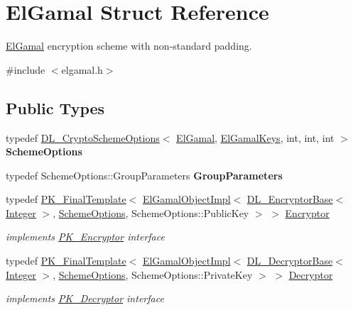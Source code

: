 \hypertarget{struct_el_gamal}{
\section{ElGamal Struct Reference}
\label{struct_el_gamal}
}


\hyperlink{struct_el_gamal}{ElGamal} encryption scheme with non-\/standard padding.  


{\ttfamily \#include $<$elgamal.h$>$}\subsection*{Public Types}
\begin{DoxyCompactItemize}
\item 
\hypertarget{struct_el_gamal_afc9e91fc82cc2ae22244e8e4981d787b}{
typedef \hyperlink{struct_d_l___crypto_scheme_options}{DL\_\-CryptoSchemeOptions}$<$ \hyperlink{struct_el_gamal}{ElGamal}, \hyperlink{struct_el_gamal_keys}{ElGamalKeys}, int, int, int $>$ {\bfseries SchemeOptions}}
\label{struct_el_gamal_afc9e91fc82cc2ae22244e8e4981d787b}

\item 
\hypertarget{struct_el_gamal_ababaa2c05b60dca79562b7946a181bca}{
typedef SchemeOptions::GroupParameters {\bfseries GroupParameters}}
\label{struct_el_gamal_ababaa2c05b60dca79562b7946a181bca}

\item 
\hypertarget{struct_el_gamal_a0d42013cb6ebbd0e676d4c4bd6a1e991}{
typedef \hyperlink{class_p_k___final_template}{PK\_\-FinalTemplate}$<$ \hyperlink{class_el_gamal_object_impl}{ElGamalObjectImpl}$<$ \hyperlink{class_d_l___encryptor_base}{DL\_\-EncryptorBase}$<$ \hyperlink{class_integer}{Integer} $>$, \hyperlink{struct_d_l___crypto_scheme_options}{SchemeOptions}, SchemeOptions::PublicKey $>$ $>$ \hyperlink{struct_el_gamal_a0d42013cb6ebbd0e676d4c4bd6a1e991}{Encryptor}}
\label{struct_el_gamal_a0d42013cb6ebbd0e676d4c4bd6a1e991}

\begin{DoxyCompactList}\small\item\em implements \hyperlink{class_p_k___encryptor}{PK\_\-Encryptor} interface \item\end{DoxyCompactList}\item 
\hypertarget{struct_el_gamal_a934a81aa391bf255297a478ea5d61985}{
typedef \hyperlink{class_p_k___final_template}{PK\_\-FinalTemplate}$<$ \hyperlink{class_el_gamal_object_impl}{ElGamalObjectImpl}$<$ \hyperlink{class_d_l___decryptor_base}{DL\_\-DecryptorBase}$<$ \hyperlink{class_integer}{Integer} $>$, \hyperlink{struct_d_l___crypto_scheme_options}{SchemeOptions}, SchemeOptions::PrivateKey $>$ $>$ \hyperlink{struct_el_gamal_a934a81aa391bf255297a478ea5d61985}{Decryptor}}
\label{struct_el_gamal_a934a81aa391bf255297a478ea5d61985}

\begin{DoxyCompactList}\small\item\em implements \hyperlink{class_p_k___decryptor}{PK\_\-Decryptor} interface \item\end{DoxyCompactList}\end{DoxyCompactItemize}
